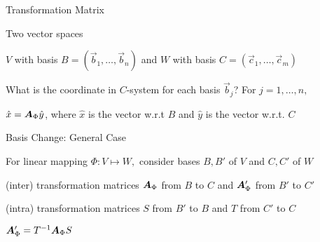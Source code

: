 \documentclass[fleqn,aspectratio=169]{beamer}
\begin{document}
\begin{frame}{Transformation Matrix}

\plitemsep 0.05in

\bci 
\item Two vector spaces 
\bci
\item $V$ with basis $B=(\vec{b}_1, \ldots, \vec{b}_n)$ and $W$ with basis $C=(\vec{c}_1, \ldots, \vec{c}_m)$
\eci

\item What is the coordinate in $C$-system for each basis $\vec{b}_j$? For $j=1, \ldots, n,$
{\small
{}}

\item $\hat{x} = \bm{A}_{\Phi} \hat{y}$, where $\hat{x}$ is the vector w.r.t $B$ and $\hat{y}$ is the vector w.r.t. $C$

\eci

\end{frame}

\begin{frame}{Basis Change: General Case}

\plitemsep 0.1in

\bci 
\item For linear mapping $\Phi: V \mapsto W,$ consider bases $B,B'$ of $V$ and $C,C'$ of $W$ 
\item (inter) transformation matrices $\bm{A}_{\Phi}$ from $B$ to $C$ and $\bm{A}'_{\Phi}$ from $B'$ to $C'$
\item (intra) transformation matrices $S$ from $B'$ to $B$ and $T$ from $C'$ to $C$
\item \thm $\bm{A}'_{\Phi} = {{T}^{-1}} \bm{A}_{\Phi} S$

\eci

\end{frame}
\end{document}
